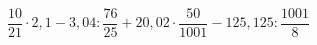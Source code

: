 \begin{ex}[type=calculate]
	\begin{condition}
		\( \dfrac{10}{21}\cdot2,1-3,04:\dfrac{76}{25}+20,02\cdot\dfrac{50}{1001}-125,125:\dfrac{1001}{8} \)
	\end{condition}
	\answer{}
\end{ex}